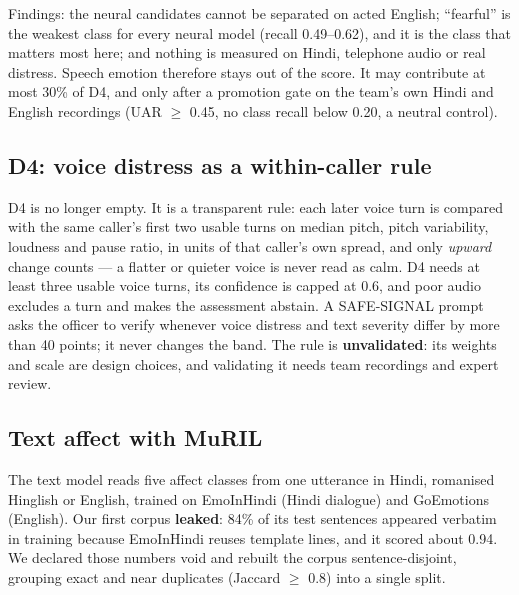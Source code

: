 \noindent Findings: the neural candidates cannot be separated on acted English; ``fearful'' is the
weakest class for every neural model (recall 0.49--0.62), and it is the class that matters most here;
and nothing is measured on Hindi, telephone audio or real distress. Speech emotion therefore stays out
of the score. It may contribute at most 30\% of D4, and only after a promotion gate on the team's own
Hindi and English recordings (UAR $\ge$ 0.45, no class recall below 0.20, a neutral control).

\subsection{D4: voice distress as a within-caller rule}
D4 is no longer empty. It is a transparent rule: each later voice turn is compared with the same
caller's first two usable turns on median pitch, pitch variability, loudness and pause ratio, in
units of that caller's own spread, and only \emph{upward} change counts --- a flatter or quieter voice
is never read as calm. D4 needs at least three usable voice turns, its confidence is capped at 0.6,
and poor audio excludes a turn and makes the assessment abstain. A SAFE-SIGNAL prompt asks the officer
to verify whenever voice distress and text severity differ by more than 40 points; it never changes
the band. The rule is \textbf{unvalidated}: its weights and scale are design choices, and validating it
needs team recordings and expert review.

\subsection{Text affect with MuRIL}
The text model reads five affect classes from one utterance in Hindi, romanised Hinglish or English,
trained on EmoInHindi (Hindi dialogue) and GoEmotions (English). Our first corpus \textbf{leaked}: 84\%
of its test sentences appeared verbatim in training because EmoInHindi reuses template lines, and it
scored about 0.94. We declared those numbers void and rebuilt the corpus sentence-disjoint, grouping
exact and near duplicates (Jaccard $\ge$ 0.8) into a single split.

